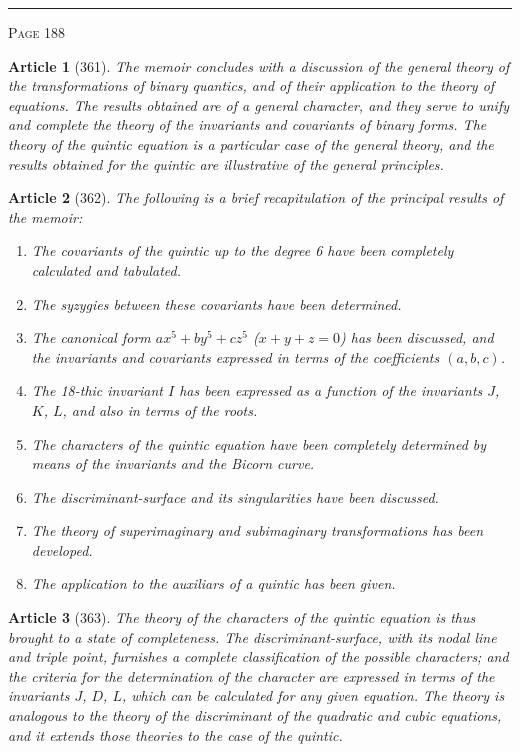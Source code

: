 \documentclass[11pt,a4paper]{article}
\theoremstyle{cayley}
\newtheorem{art}{Article}
\begin{document}
\vspace{1em}
\noindent\rule{\textwidth}{0.4pt}
\begin{center}\textsc{Page 188}\end{center}
\newpage

\begin{art}[361]
The memoir concludes with a discussion of the general theory of the transformations of binary quantics, and of their application to the theory of equations. The results obtained are of a general character, and they serve to unify and complete the theory of the invariants and covariants of binary forms. The theory of the quintic equation is a particular case of the general theory, and the results obtained for the quintic are illustrative of the general principles.
\end{art}

\begin{art}[362]
The following is a brief recapitulation of the principal results of the memoir:
\begin{enumerate}[label=\arabic*.,itemsep=2pt]
\item The covariants of the quintic up to the degree 6 have been completely calculated and tabulated.
\item The syzygies between these covariants have been determined.
\item The canonical form $ax^5 + by^5 + cz^5$ ($x+y+z=0$) has been discussed, and the invariants and covariants expressed in terms of the coefficients $(a, b, c)$.
\item The 18-thic invariant $I$ has been expressed as a function of the invariants $J$, $K$, $L$, and also in terms of the roots.
\item The characters of the quintic equation have been completely determined by means of the invariants and the Bicorn curve.
\item The discriminant-surface and its singularities have been discussed.
\item The theory of superimaginary and subimaginary transformations has been developed.
\item The application to the auxiliars of a quintic has been given.
\end{enumerate}
\end{art}

\begin{art}[363]
The theory of the characters of the quintic equation is thus brought to a state of completeness. The discriminant-surface, with its nodal line and triple point, furnishes a complete classification of the possible characters; and the criteria for the determination of the character are expressed in terms of the invariants $J$, $D$, $L$, which can be calculated for any given equation. The theory is analogous to the theory of the discriminant of the quadratic and cubic equations, and it extends those theories to the case of the quintic.
\end{art}
\end{document}
